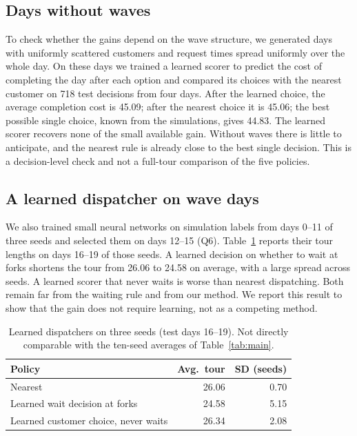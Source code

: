 \documentclass[5p,times,authoryear]{elsarticle}
\begin{document}
\subsection{Days without waves}
\label{sec:uniform}

To check whether the gains depend on the wave structure, we generated days with uniformly scattered customers and request times spread uniformly over the whole day. On these days we trained a learned scorer to predict the cost of completing the day after each option and compared its choices with the nearest customer on 718 test decisions from four days. After the learned choice, the average completion cost is 45.09; after the nearest choice it is 45.06; the best possible single choice, known from the simulations, gives 44.83. The learned scorer recovers none of the small available gain. Without waves there is little to anticipate, and the nearest rule is already close to the best single decision. This is a decision-level check and not a full-tour comparison of the five policies.

\subsection{A learned dispatcher on wave days}
\label{sec:learned}

We also trained small neural networks on simulation labels from days 0--11 of three seeds and selected them on days 12--15 (Q6). Table~\ref{tab:learned} reports their tour lengths on days 16--19 of those seeds. A learned decision on whether to wait at forks shortens the tour from 26.06 to 24.58 on average, with a large spread across seeds. A learned scorer that never waits is worse than nearest dispatching. Both remain far from the waiting rule and from our method. We report this result to show that the gain does not require learning, not as a competing method.

\begin{table}[t]
\centering
\footnotesize
\caption{Learned dispatchers on three seeds (test days 16--19). Not directly comparable with the ten-seed averages of Table~\ref{tab:main}.}
\label{tab:learned}
\begin{tabular}{@{}lrr@{}}
\toprule
Policy & Avg.\ tour & SD (seeds) \\
\midrule
Nearest & 26.06 & 0.70 \\
Learned wait decision at forks & 24.58 & 5.15 \\
Learned customer choice, never waits & 26.34 & 2.08 \\
\bottomrule
\end{tabular}
\end{table}
\end{document}
